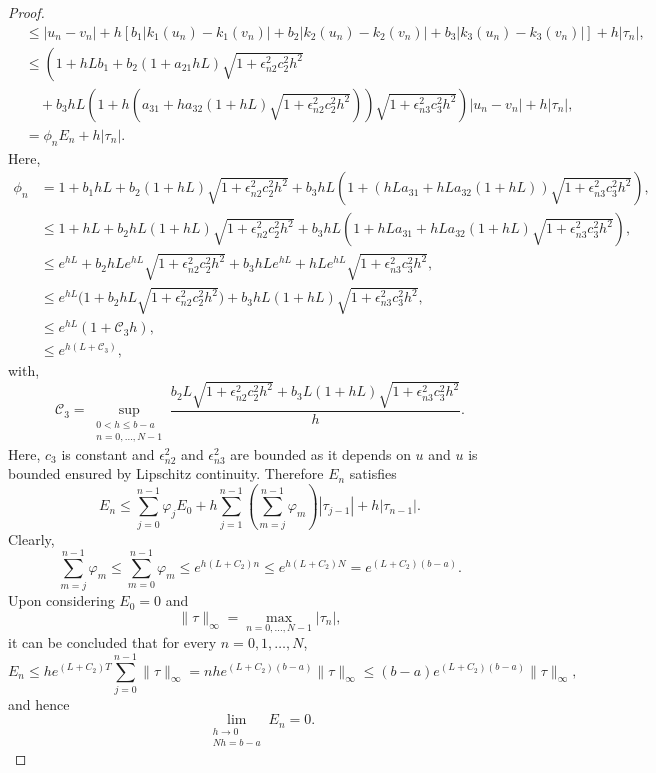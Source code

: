 \documentclass[a4paper, preprint,11pt]{elsarticle}
\numberwithin{equation}{section}
\begin{document}
\begin{proof}
\begin{align*}
    & \leq |u_n - v_n| + h \left[ b_1|k_1(u_n) - k_1(v_n)| + b_2|k_2(u_n) - k_2(v_n)| + b_3|k_3(u_n) - k_3(v_n)| \right] + h|\tau_n|, \\
    & \leq \left( 1 + hLb_1 + b_2(1 + a_{21}hL)\sqrt{1 + \epsilon_{n2}^2 c_2^2 h^2} \right. \\
    & \quad + \left. b_3 hL \left( 1 + h \left( a_{31} + ha_{32}(1 + hL) \sqrt{1 + \epsilon_{n2}^2 c_2^2 h^2} \right) \right) \sqrt{1 + \epsilon_{n3}^2 c_3^2 h^2} \right) \left| u_n - v_n \right| + h|\tau_n|, \\
    & = \phi_n E_n + h|\tau_n|.
\end{align*}
Here,
\begin{align*}
    \phi_n & = 1 + b_1hL + b_2 (1 + hL)  \sqrt{1 + \epsilon_{n2}^2 c_{2}^2 h^2} + b_3hL\left( 1 + (hLa_{31} + hLa_{32}(1 +hL))\sqrt{1 + \epsilon_{n3}^2c_3^2h^2}    \right),\\
   & \leq 1 + h L + b_2hL( 1 + hL)\sqrt{1 + \epsilon_{n2}^2c_2^2h^2} + b_3hL\left(1 + hLa_{31} + hLa_{32}(1+hL)\sqrt{1 + \epsilon_{n3}^2c_3^2h^2}\right),\\
   & \leq e^{hL} + b_2hLe^{hL}\sqrt{1+\epsilon_{n2}^2c_2^2h^2} +b_3hL{e^{hL}+ hLe^{hL}}\sqrt{1 + \epsilon_{n3}^2c_3^2h^2},\\
   & \leq e^{hL} \biggl(1 + b_2hL \sqrt{1 + \epsilon_{n2}^2c_2^2h^2}\biggl)+ b_3hL(1 + hL)\sqrt{ 1 
   + \epsilon_{n3}^2c_3^2h^2}, \\
   & \leq  e^{hL}(1 + \mathcal{C}_3h ),   \\
   & \leq e^{h(L+\mathcal{C}_3)},
\end{align*} with,
\[
\mathcal{C}_3 = \sup_{\substack{0 < h \leq b - a \\ n = 0, \dots, N - 1}} 
\frac{ b_2L\sqrt{1 + \epsilon_{n2}^2 c_2^2 h^2} + b_3L (1+hL)\sqrt{1+\epsilon_{n3}^2c_3^2h^2}}{h}.
\]
Here, $c_3$ is constant and $\epsilon_{n2}^2$ and $\epsilon_{n3}^2$ are bounded as it depends on $u$ and $u$ is bounded ensured by Lipschitz continuity.
Therefore $E_n$ satisfies
\begin{equation*}
    E_n \leq \sum_{j=0}^{n-1} \varphi_j E_0 + h \sum_{j=1}^{n-1} \left( \sum_{m=j}^{n-1} \varphi_m \right) |\tau_{j-1}| + h |\tau_{n-1}|.
\end{equation*}
Clearly,
\begin{equation*}
    \sum_{m=j}^{n-1} \varphi_m \leq \sum_{m=0}^{n-1} \varphi_m \leq e^{h(L + C_2) n} \leq e^{h(L + C_2) N} = e^{(L + C_2)(b - a)}.
\end{equation*}
Upon considering  \( E_0 = 0 \) and
\[
\|\tau\|_\infty = \max_{n = 0, \dots, N-1} |\tau_n|,
\]
it can be concluded that for every \( n = 0, 1, \dots, N \),
\begin{equation*}
    E_n \leq h e^{(L + C_2) T} \sum_{j=0}^{n-1} \|\tau\|_\infty = n h e^{(L + C_2)(b - a)} \|\tau\|_\infty \leq (b - a) e^{(L + C_2)(b - a)} \|\tau\|_\infty,
\end{equation*}
and hence 
\begin{equation*}
\lim_{\substack{h \to 0 \\ N h = b - a}} E_n = 0.
\end{equation*}
\end{proof}
\end{document}
